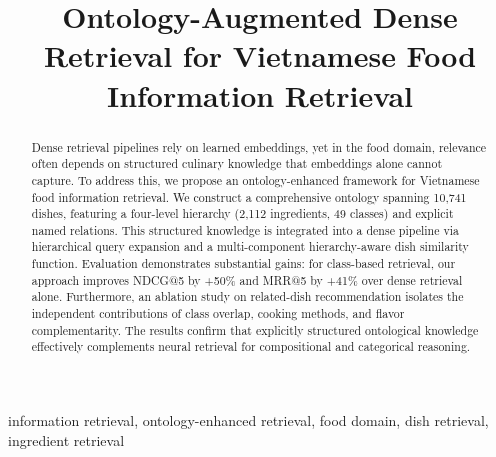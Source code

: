 \documentclass[conference]{IEEEtran}
\begin{document}
\title{Ontology-Augmented Dense Retrieval for Vietnamese Food Information Retrieval}

\author{
\and
{}
\and
{}
}

\maketitle

\begin{abstract}
Dense retrieval pipelines rely on learned embeddings, yet in the food domain, relevance often depends on structured culinary knowledge that embeddings alone cannot capture. To address this, we propose an ontology-enhanced framework for Vietnamese food information retrieval. We construct a comprehensive ontology spanning 10{,}741 dishes, featuring a four-level hierarchy (2{,}112 ingredients, 49 classes) and explicit named relations. This structured knowledge is integrated into a dense pipeline via hierarchical query expansion and a multi-component hierarchy-aware dish similarity function. Evaluation demonstrates substantial gains: for class-based retrieval, our approach improves NDCG@5 by +50\% and MRR@5 by +41\% over dense retrieval alone. Furthermore, an ablation study on related-dish recommendation isolates the independent contributions of class overlap, cooking methods, and flavor complementarity. The results confirm that explicitly structured ontological knowledge effectively complements neural retrieval for compositional and categorical reasoning.
\end{abstract}

\begin{IEEEkeywords}
information retrieval, ontology-enhanced retrieval, food domain, dish retrieval, ingredient retrieval
\end{IEEEkeywords}
\end{document}
